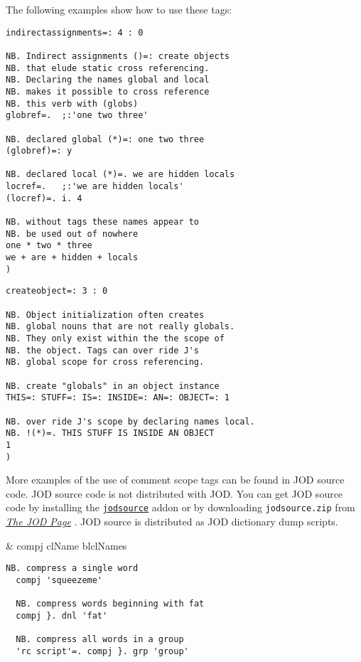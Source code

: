    The following examples show how to use these tags:

\begin{lstlisting}[frame=single,framerule=0pt]  
indirectassignments=: 4 : 0

NB. Indirect assignments ()=: create objects 
NB. that elude static cross referencing. 
NB. Declaring the names global and local
NB. makes it possible to cross reference 
NB. this verb with (globs)
globref=.  ;:'one two three'

NB. declared global (*)=: one two three
(globref)=: y     

NB. declared local (*)=. we are hidden locals
locref=.   ;:'we are hidden locals'
(locref)=. i. 4  

NB. without tags these names appear to
NB. be used out of nowhere 
one * two * three
we + are + hidden + locals
)
\end{lstlisting}

     
\begin{lstlisting}[frame=single,framerule=0pt]    
createobject=: 3 : 0

NB. Object initialization often creates
NB. global nouns that are not really globals.
NB. They only exist within the the scope of
NB. the object. Tags can over ride J's 
NB. global scope for cross referencing.

NB. create "globals" in an object instance
THIS=: STUFF=: IS=: INSIDE=: AN=: OBJECT=: 1

NB. over ride J's scope by declaring names local.
NB. !(*)=. THIS STUFF IS INSIDE AN OBJECT
1
)
\end{lstlisting}

    More examples of the use of comment scope tags can be found in 
      JOD source code.  JOD source code is not 
     distributed with JOD.  You can get JOD source code by installing
     the  \href{http://www.jsoftware.com/jwiki/Addons/general/jodsource}{\texttt{jodsource}}
     addon or by downloading \verb|jodsource.zip| from 
     \href{http://bakerjd99.wordpress.com/the-jod-page/}{\emph{The JOD Page}} \cite{baker:jodpages}.  
     JOD source is distributed as JOD dictionary dump scripts.

\begin{wordhead}
\monad & compj clName \argsep blclNames \\
\end{wordhead}
\begin{lstlisting}[frame=single,framerule=0pt]
  NB. compress a single word
  compj 'squeezeme'  
  
  NB. compress words beginning with fat
  compj }. dnl 'fat' 

  NB. compress all words in a group 
  'rc script'=. compj }. grp 'group'
\end{lstlisting}

